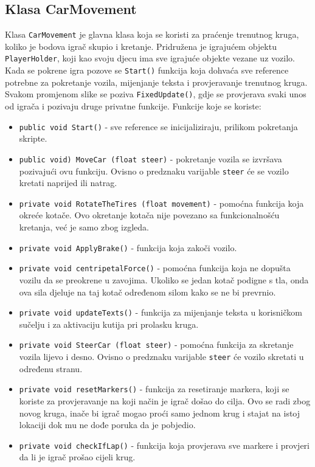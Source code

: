 \subsection{Klasa CarMovement}
Klasa \texttt{CarMovement} je glavna klasa koja se koristi za praćenje trenutnog kruga, koliko je bodova igrač skupio i kretanje. Pridružena je igrajućem objektu \texttt{PlayerHolder}, koji kao svoju djecu ima sve igrajuće objekte vezane uz vozilo. Kada se pokrene igra pozove se \texttt{Start()} funkcija koja dohvaća sve reference potrebne za pokretanje vozila, mijenjanje teksta i provjeravanje trenutnog kruga. Svakom promjenom slike se poziva \texttt{FixedUpdate()}, gdje se provjerava svaki unos od igrača i pozivaju druge privatne funkcije. Funkcije koje se koriste:
\begin{itemize}
	\item \texttt{public void Start()} - sve reference se inicijaliziraju, prilikom pokretanja skripte.
	\item \texttt{public void) MoveCar (float steer)} - pokretanje vozila se izvršava pozivajući ovu funkciju. Ovisno o predznaku varijable \texttt{steer} će se vozilo kretati naprijed ili natrag.
	\item \texttt{private void RotateTheTires (float movement)} - pomoćna funkcija koja okreće kotače. Ovo okretanje kotača nije povezano sa funkcionalnošću kretanja, već je samo zbog izgleda.
	\item \texttt{private void ApplyBrake()} - funkcija koja zakoči vozilo.
	\item \texttt{private void centripetalForce()} - pomoćna funkcija koja ne dopušta vozilu da se preokrene u zavojima. Ukoliko se jedan kotač podigne s tla, onda ova sila djeluje na taj kotač određenom silom kako se ne bi prevrnio.
	\item \texttt{private void updateTexts()} - funkcija za mijenjanje teksta u korisničkom sučelju i za aktivaciju kutija pri prolasku kruga.
	\item \texttt{private void SteerCar (float steer)} - pomoćna funkcija za skretanje vozila lijevo i desno. Ovisno o predznaku varijable \texttt{steer} će vozilo skretati u određenu stranu.
	\item \texttt{private void resetMarkers()} - funkcija za resetiranje markera, koji se koriste za provjeravanje na koji način je igrač došao do cilja. Ovo se radi zbog novog kruga, inače bi igrač mogao proći samo jednom krug i stajat na istoj lokaciji dok mu ne dođe poruka da je pobjedio.
	\item \texttt{private void checkIfLap()} - funkcija koja provjerava sve markere i provjeri da li je igrač prošao cijeli krug.

\end{itemize}
